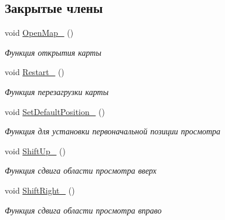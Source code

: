 \subsection*{Закрытые члены}
\begin{DoxyCompactItemize}
\item 
\mbox{\label{classrtm_1_1_world_scene_ac7b1c0b254cec69702731656e956408c}} 
void \hyperlink{classrtm_1_1_world_scene_ac7b1c0b254cec69702731656e956408c}{Open\+Map\+\_\+} ()
\begin{DoxyCompactList}\small\item\em Функция открытия карты \end{DoxyCompactList}\item 
\mbox{\label{classrtm_1_1_world_scene_acbad351934c371965ee9da74b3dba955}} 
void \hyperlink{classrtm_1_1_world_scene_acbad351934c371965ee9da74b3dba955}{Restart\+\_\+} ()
\begin{DoxyCompactList}\small\item\em Функция перезагрузки карты \end{DoxyCompactList}\item 
\mbox{\label{classrtm_1_1_world_scene_aed8f5c4d5a0ff42e806adaf141da0cc7}} 
void \hyperlink{classrtm_1_1_world_scene_aed8f5c4d5a0ff42e806adaf141da0cc7}{Set\+Default\+Position\+\_\+} ()
\begin{DoxyCompactList}\small\item\em Функция для установки первоначальной позиции просмотра \end{DoxyCompactList}\item 
\mbox{\label{classrtm_1_1_world_scene_a60c760a9f665e3863a80d191be7de87b}} 
void \hyperlink{classrtm_1_1_world_scene_a60c760a9f665e3863a80d191be7de87b}{Shift\+Up\+\_\+} ()
\begin{DoxyCompactList}\small\item\em Функция сдвига области просмотра вверх \end{DoxyCompactList}\item 
\mbox{\label{classrtm_1_1_world_scene_a125e4ae96bd562cc124a369929c49b21}} 
void \hyperlink{classrtm_1_1_world_scene_a125e4ae96bd562cc124a369929c49b21}{Shift\+Right\+\_\+} ()
\begin{DoxyCompactList}\small\item\em Функция сдвига области просмотра вправо \end{DoxyCompactList}\item 

\end{DoxyCompactItemize}
